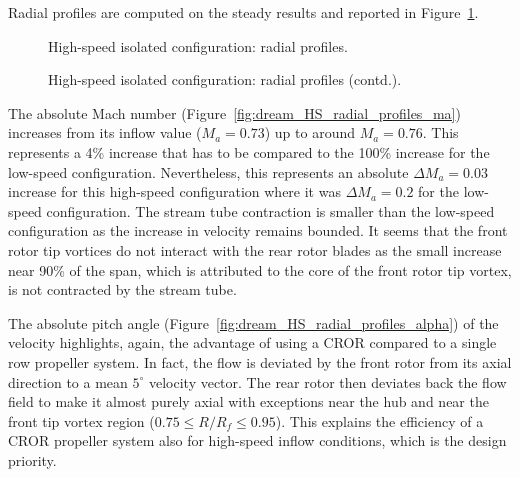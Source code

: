 Radial profiles are computed on the steady results and 
reported in Figure~\ref{fig:dream_HS_radial_profiles}.
\begin{figure}[htp]
  \centering
  \caption{High-speed isolated configuration: radial profiles.}
\end{figure}
\begin{figure}[htp]
  \centering
  \setcounter{subfigure}{3}
  \caption{High-speed isolated configuration: radial profiles (contd.).}
  \label{fig:dream_HS_radial_profiles}
\end{figure}

The absolute Mach number (Figure~\ref{fig:dream_HS_radial_profiles_ma}) 
increases from its inflow
value ($M_a = 0.73$) up to around $M_a=0.76$. This represents
a 4\% increase that has to be compared to the 100\% increase
for the low-speed configuration. Nevertheless, this represents
an absolute $\Delta M_a = 0.03$ increase for this high-speed
configuration where it was $\Delta M_a = 0.2$
for the low-speed configuration. The stream tube contraction
is smaller than the low-speed configuration 
as the increase in velocity remains bounded.
It seems that the front rotor tip vortices do not interact
with the rear rotor blades as the small increase near 90\%
of the span, which is attributed to the core of the front rotor tip vortex,
is not contracted by the stream tube.

The absolute pitch angle (Figure~\ref{fig:dream_HS_radial_profiles_alpha}) 
of the velocity highlights, again, the advantage
of using a CROR compared to a single row propeller system. In fact,
the flow is deviated by the front rotor from its axial direction
to a mean $5^\circ$ velocity vector. The rear rotor then deviates
back the flow field to make it almost purely axial with exceptions
near the hub and near the front tip vortex region ($0.75 \leq R/R_f \leq 0.95$).
This explains the efficiency of a CROR propeller system also for high-speed
inflow conditions, which is the design priority.

